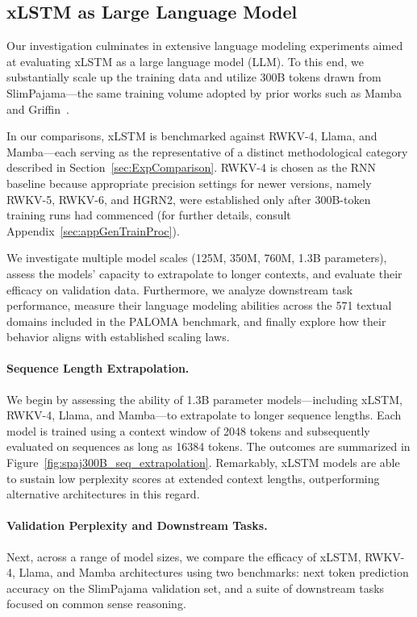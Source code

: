 \subsection{xLSTM as Large Language Model}
\label{sec:ExpLanguage}

Our investigation culminates in extensive language modeling experiments aimed at evaluating xLSTM as a large language model (LLM). To this end, we substantially scale up the training data and utilize 300B tokens drawn from SlimPajama—the same training volume adopted by prior works such as Mamba~\citep{Gu:24arxiv} and Griffin~\citep{De:24arxiv}.

In our comparisons, xLSTM is benchmarked against RWKV-4, Llama, and Mamba—each serving as the representative of a distinct methodological category described in Section~\ref{sec:ExpComparison}. RWKV-4 is chosen as the RNN baseline because appropriate precision settings for newer versions, namely RWKV-5, RWKV-6, and HGRN2, were established only after 300B-token training runs had commenced (for further details, consult Appendix~\ref{sec:appGenTrainProc}).

We investigate multiple model scales (125M, 350M, 760M, 1.3B parameters), assess the models’ capacity to extrapolate to longer contexts, and evaluate their efficacy on validation data. Furthermore, we analyze downstream task performance, measure their language modeling abilities across the 571 textual domains included in the PALOMA benchmark, and finally explore how their behavior aligns with established scaling laws.

\paragraph{Sequence Length Extrapolation.}
\label{sec:spaj300B_ctx_extrapolation}
We begin by assessing the ability of 1.3B parameter models—including xLSTM, RWKV-4, Llama, and Mamba—to extrapolate to longer sequence lengths. Each model is trained using a context window of 2048 tokens and subsequently evaluated on sequences as long as 16384 tokens. The outcomes are summarized in Figure~\ref{fig:spaj300B_seq_extrapolation}. Remarkably, xLSTM models are able to sustain low perplexity scores at extended context lengths, outperforming alternative architectures in this regard.

\paragraph{Validation Perplexity and Downstream Tasks.}
\label{sec:spaj_downstream_eval}
Next, across a range of model sizes, we compare the efficacy of xLSTM, RWKV-4, Llama, and Mamba architectures using two benchmarks: next token prediction accuracy on the SlimPajama validation set, and a suite of downstream tasks focused on common sense reasoning.

